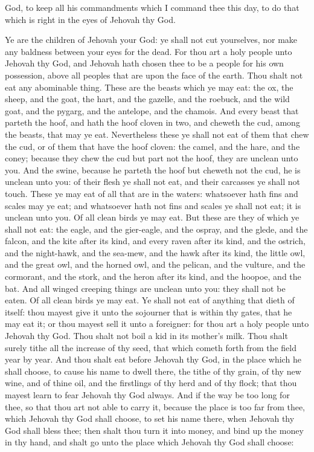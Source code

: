 God, to keep all his commandments which I command thee this day, to do that which is right in the eyes of Jehovah thy God. 

Ye are the children of Jehovah your God: ye shall not cut yourselves, nor make any baldness between your eyes for the dead. For thou art a holy people unto Jehovah thy God, and Jehovah hath chosen thee to be a people for his own possession, above all peoples that are upon the face of the earth.  Thou shalt not eat any abominable thing. These are the beasts which ye may eat: the ox, the sheep, and the goat, the hart, and the gazelle, and the roebuck, and the wild goat, and the pygarg, and the antelope, and the chamois. And every beast that parteth the hoof, and hath the hoof cloven in two, and cheweth the cud, among the beasts, that may ye eat. Nevertheless these ye shall not eat of them that chew the cud, or of them that have the hoof cloven: the camel, and the hare, and the coney; because they chew the cud but part not the hoof, they are unclean unto you. And the swine, because he parteth the hoof but cheweth not the cud, he is unclean unto you: of their flesh ye shall not eat, and their carcasses ye shall not touch.  These ye may eat of all that are in the waters: whatsoever hath fins and scales may ye eat; and whatsoever hath not fins and scales ye shall not eat; it is unclean unto you.  Of all clean birds ye may eat. But these are they of which ye shall not eat: the eagle, and the gier-eagle, and the ospray, and the glede, and the falcon, and the kite after its kind, and every raven after its kind, and the ostrich, and the night-hawk, and the sea-mew, and the hawk after its kind, the little owl, and the great owl, and the horned owl, and the pelican, and the vulture, and the cormorant, and the stork, and the heron after its kind, and the hoopoe, and the bat. And all winged creeping things are unclean unto you: they shall not be eaten. Of all clean birds ye may eat.  Ye shall not eat of anything that dieth of itself: thou mayest give it unto the sojourner that is within thy gates, that he may eat it; or thou mayest sell it unto a foreigner: for thou art a holy people unto Jehovah thy God. Thou shalt not boil a kid in its mother’s milk.  Thou shalt surely tithe all the increase of thy seed, that which cometh forth from the field year by year. And thou shalt eat before Jehovah thy God, in the place which he shall choose, to cause his name to dwell there, the tithe of thy grain, of thy new wine, and of thine oil, and the firstlings of thy herd and of thy flock; that thou mayest learn to fear Jehovah thy God always. And if the way be too long for thee, so that thou art not able to carry it, because the place is too far from thee, which Jehovah thy God shall choose, to set his name there, when Jehovah thy God shall bless thee; then shalt thou turn it into money, and bind up the money in thy hand, and shalt go unto the place which Jehovah thy God shall choose: 
